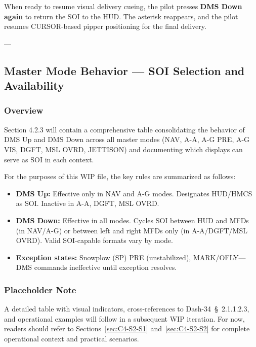 \documentclass[11pt,a4paper]{article}
\providecommand{\dashref}[1]{Dash-34~\S~#1}
\begin{document}
When ready to resume visual delivery cueing, the pilot presses \textbf{DMS Down again} to return the SOI to the HUD. The asterisk reappears, and the pilot resumes CURSOR-based pipper positioning for the final delivery.

---

\subsection{Master Mode Behavior --- SOI Selection and Availability}

\label{sec:C4-S2-S3}

\subsubsection{Overview}

Section 4.2.3 will contain a comprehensive table consolidating the behavior of DMS Up and DMS Down across all master modes (NAV, A-A, A-G PRE, A-G VIS, DGFT, MSL OVRD, JETTISON) and documenting which displays can serve as SOI in each context.

For the purposes of this WIP file, the key rules are summarized as follows:

\begin{itemize}

\item \textbf{DMS Up:} Effective only in NAV and A-G modes. Designates HUD/HMCS as SOI. Inactive in A-A, DGFT, MSL OVRD.

\item \textbf{DMS Down:} Effective in all modes. Cycles SOI between HUD and MFDs (in NAV/A-G) or between left and right MFDs only (in A-A/DGFT/MSL OVRD). Valid SOI-capable formats vary by mode.

\item \textbf{Exception states:} Snowplow (SP) PRE (unstabilized), MARK/OFLY---DMS commands ineffective until exception resolves.

\end{itemize}

\subsubsection{Placeholder Note}

A detailed table with visual indicators, cross-references to \dashref{2.1.1.2.3}, and operational examples will follow in a subsequent WIP iteration. For now, readers should refer to Sections~\ref{sec:C4-S2-S1} and~\ref{sec:C4-S2-S2} for complete operational context and practical scenarios.

\end{document}
